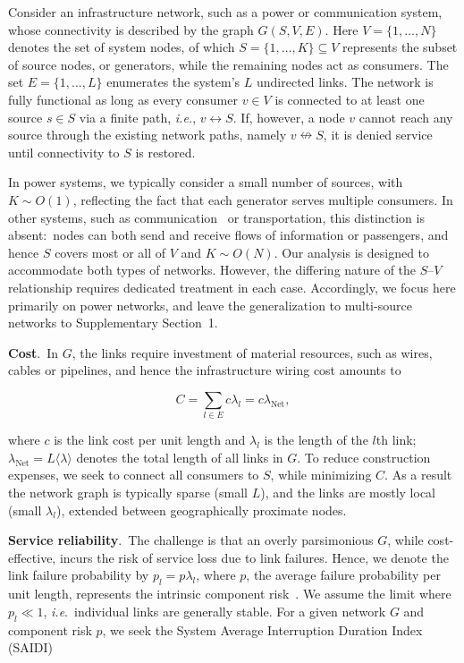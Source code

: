 \documentclass[oneside, a4paper, onecolumn, 11pt]{article}
\newcommand{\av}[1]{\langle #1 \rangle}
\begin{document}
\begin{refsection}
Consider an infrastructure network, such as a power or communication system, whose connectivity is described by the graph $G(S,V,E)$. Here $V = \{1,\dots,N\}$ denotes the set of system nodes, of which $S = \{1,\dots,K\} \subseteq V$ represents the subset of source nodes, or generators, while the remaining nodes act as consumers. The set $E = \{1,\dots,L\}$ enumerates the system’s $L$ undirected links. The network is fully functional as long as every consumer $v \in V$ is connected to at least one source $s \in S$ via a finite path, \textit{i.e.}, $v \leftrightarrow S$. If, however, a node $v$ cannot reach any source through the existing network paths, namely $v \nleftrightarrow S$, it is denied service until connectivity to $S$ is restored.

In power systems, we typically consider a small number of sources, with $K \sim O(1)$, reflecting the fact that each generator serves multiple consumers. In other systems, such as communication~\supercite{neumayer2011assessing} or transportation, this distinction is absent:\ nodes can both send and receive flows of information or passengers, and hence $S$ covers most or all of $V$ and $K \sim O(N)$. Our analysis is designed to accommodate both types of networks. However, the differing nature of the $S$–$V$ relationship requires dedicated treatment in each case. Accordingly, we focus here primarily on power networks, and leave the generalization to multi-source networks to Supplementary Section~1.

\vspace{3mm}
\textbf{\color{blue} Cost}.\
In $G$, the links require investment of material resources, such as wires, cables or pipelines, and hence the infrastructure wiring cost amounts to

\begin{equation}
C = \sum_{l \in E} c \lambda_l = c \lambda_{\text{Net}},
\label{eq:Cost}
\end{equation}

where $c$ is the link cost per unit length and $\lambda_l$ is the length of the $l$th link; $\lambda_{\text{Net}} = L \av \lambda$ denotes the total length of all links in $G$. To reduce construction expenses, we seek to connect all consumers to $S$, while minimizing $C$. As a result the network graph is typically sparse (small $L$), and the links are mostly local (small $\lambda_l$), extended between geographically proximate nodes.  

\vspace{3mm}
\textbf{\color{blue} Service reliability}.\ 
The challenge is that an overly parsimonious $G$, while cost-effective, incurs the risk of service loss due to link failures. Hence, we denote the link failure probability by $p_l = p \lambda_l$, where $p$, the average failure probability per unit length, represents the intrinsic component risk~\supercite{allan2013reliability,neumayer2011assessing}. We assume the limit where $p_l \ll 1$, \textit{i.e}.\ individual links are generally stable. For a given network $G$ and component risk $p$, we seek the System Average Interruption Duration Index (SAIDI)~\supercite{allan2013reliability,IEEE_guide,trifunovic2006water} 


\end{refsection}
\end{document}
